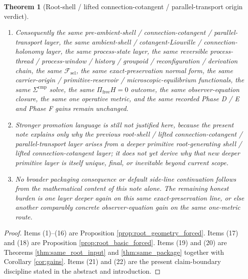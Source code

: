\documentclass[11pt]{article}
\newcommand{\StemFunctional}{\mathscr F_{\mathrm{sel}}}
\newtheorem{theorem}{Theorem}
\begin{document}
\begin{theorem}[Root-shell / lifted connection-cotangent / parallel-transport origin verdict]
\begin{enumerate}
    \item Consequently the same pre-ambient-shell / connection-cotangent / parallel-transport layer, the same ambient-shell / cotangent-Liouville / connection-holonomy layer, the same process-state layer, the same reversible process-thread / process-window / history / groupoid / reconfiguration / derivation chain, the same \(\StemFunctional\), the same exact-preservation normal form, the same carrier-origin / primitive-reservoir / microscopic-equilibrium functionals, the same \(\Sigma^{\mathrm{cmp}}\) solve, the same \(\Pi_{\mathrm{free}}H=0\) outcome, the same observer-equation closure, the same one operative metric, and the same recorded Phase D / E and Phase F gains remain unchanged.
    \item Stronger promotion language is still not justified here, because the present note explains only why the previous root-shell / lifted connection-cotangent / parallel-transport layer arises from a deeper primitive root-generating shell / lifted connection-cotangent layer; it does not yet derive why that new deeper primitive layer is itself unique, final, or inevitable beyond current scope.
    \item No broader packaging consequence or default side-line continuation follows from the mathematical content of this note alone. The remaining honest burden is one layer deeper again on this same exact-preservation line, or else another comparably concrete observer-equation gain on the same one-metric route.
\end{enumerate}
\end{theorem}

\begin{proof}
Items (1)--(16) are Proposition \ref{prop:root_geometry_forced}. Items (17) and (18) are Proposition \ref{prop:root_basic_forced}. Items (19) and (20) are Theorems \ref{thm:same_root_input} and \ref{thm:same_package} together with Corollary \ref{cor:gains}. Items (21) and (22) are the present claim-boundary discipline stated in the abstract and introduction.
\end{proof}
\end{document}
